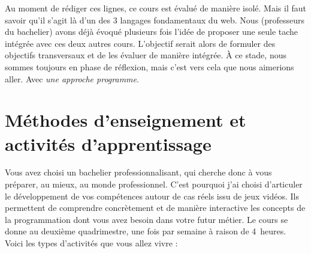 Au moment de rédiger ces lignes, ce cours est évalué de manière isolé. Mais il faut savoir qu'il s'agit là d'un des 3 langages fondamentaux du web. Nous (professeurs du bachelier) avons déjà évoqué plusieurs fois l'idée de proposer une seule tache intégrée avec ces deux autres cours. L'objectif serait alors de formuler des objectifs transversaux et de les évaluer de manière intégrée. À ce stade, nous sommes toujours en phase de réflexion, mais c'est vers cela que nous aimerions aller. Avec \emph{une approche programme}.

\clearpage
\section{Méthodes d’enseignement et activités d’apprentissage}
\label{methodes_d_enseignement_et_activites_d_apprentissage}
Vous avez choisi un bachelier professionnalisant, qui cherche donc à vous préparer, au mieux, au monde professionnel. C’est pourquoi j’ai choisi d’articuler le développement de vos compétences autour de cas réels issu de jeux vidéos. Ils permettent de comprendre concrètement et de manière interactive les concepts de la programmation dont vous avez besoin dans votre futur métier. Le cours se donne au deuxième quadrimestre, une fois par semaine à raison de 4~heures. Voici les types d'activités que vous allez vivre :
